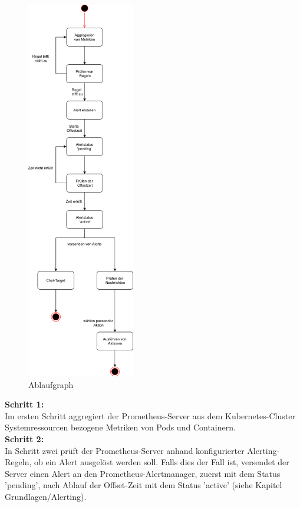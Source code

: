 \documentclass[a4paper,10pt]{scrartcl}
\begin{document}
\begin{figure}

\begin{center}
  \includegraphics[width=0.42\textwidth,height=1.32\textwidth]{img/AAMtextless.PNG}
  \caption{Ablaufgraph}
\end{center}

\end{figure}
\textbf{Schritt 1:}\\
Im ersten Schritt aggregiert der Prometheus-Server
aus dem Kubernetes-Cluster Systemressourcen bezogene Metriken
von Pods und Containern.\\

\textbf{Schritt 2:}\\
In Schritt zwei prüft der Prometheus-Server anhand konfigurierter Alerting-Regeln,
ob ein Alert ausgelöst werden soll. Falls dies der Fall ist,
versendet der Server einen Alert an den Prometheus-Alertmanager,
 zuerst mit dem Status 'pending',
nach Ablauf der Offset-Zeit mit dem Status 'active' (siehe Kapitel Grundlagen/Alerting).
\end{document}
